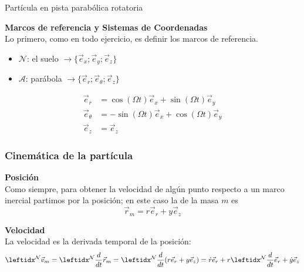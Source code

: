 \begin{solucion}{Partícula en pista parabólica rotatoria}

\textbf{Marcos de referencia y Sistemas de Coordenadas}\\
Lo primero, como en todo ejercicio, es definir los marcos de referencia.
\begin{itemize}
    \item $\mathcal{N}$: el suelo $\longrightarrow\{\vec{e}_x;\vec{e}_y;\vec{e}_z\}$
    \item $\mathcal{A}$: parábola $\longrightarrow\{\vec{e}_r;\vec{e}_\theta;\vec{e}_z\}$
\end{itemize}

\begin{center}
\end{center}

\begin{equation*}
\begin{split}
    \vec{e}_r&=\cos(\Omega t)\vec{e}_x+\sin(\Omega t)\vec{e}_y\\
    \vec{e}_\theta&=-\sin(\Omega t)\vec{e}_x+\cos(\Omega t)\vec{e}_y\\
    \vec{e}_z&=\vec{e}_z
\end{split}
\end{equation*}

\subsubsection*{Cinemática de la partícula}
\textbf{Posición}\\
Como siempre, para obtener la velocidad de algún punto respecto a un marco inercial partimos por la posición; en este caso la de la masa $m$ es
$$\vec{r}_m=r\vec{e}_r+y\vec{e}_z$$

\textbf{Velocidad}\\
La velocidad es la derivada temporal de la posición:
$$\marc{\vec{v}_m}{N}=\der{\vec{r}_{m}}{N}=\der{(r\vec{e}_r+ y\vec{e}_z)}{N}=\dot r\vec{e}_r+r\der{\vec{e}_r}{N}{}+\dot y\vec{e}_z$$



\end{solucion}
